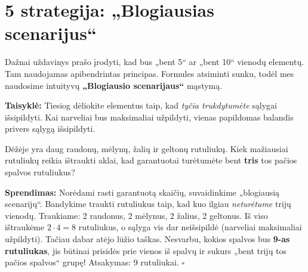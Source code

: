 \documentclass[11pt,a4paper]{scrartcl}
\newenvironment{solution}
    {\begin{list}{}{\setlength{\leftmargin}{10pt}\setlength{\rightmargin}{10pt}}\item[]}
    {\end{list}}
\begin{document}
\section{5 strategija: „Blogiausias scenarijus“}

Dažnai uždavinys prašo įrodyti, kad bus „bent 5“ ar „bent 10“ vienodų elementų. Tam naudojamas apibendrintas principas. Formules atsiminti sunku, todėl mes naudosime intuityvų \textbf{„Blogiausio scenarijaus“} mąstymą.

\textbf{Taisyklė:} Tiesiog dėliokite elementus taip, kad \textit{tyčia trukdytumėte} sąlygai išsipildyti. Kai narveliai bus maksimaliai užpildyti, vienas papildomas balandis privers sąlygą išsipildyti.

\begin{example}
Dėžėje yra daug raudonų, mėlynų, žalių ir geltonų rutuliukų. Kiek mažiausiai rutuliukų reikia ištraukti aklai, kad garantuotai turėtumėte bent \textbf{tris} tos pačios spalvos rutuliukus?
\end{example}

\begin{solution}
\textbf{Sprendimas:} Norėdami rasti garantuotą skaičių, suvaidinkime „blogiausią scenarijų“. Bandykime traukti rutuliukus taip, kad kuo ilgiau \textit{neturėtume} trijų vienodų.
Traukiame: 2 raudonus, 2 mėlynus, 2 žalius, 2 geltonus. 
Iš viso ištraukėme $2 \cdot 4 = 8$ rutuliukus, o sąlyga vis dar neišsipildė (narveliai maksimaliai užpildyti).
Tačiau dabar atėjo lūžio taškas. Nesvarbu, kokios spalvos bus \textbf{9-as rutuliukas}, jis būtinai prisidės prie vienos iš spalvų ir sukurs „bent trijų tos pačios spalvos“ grupę! Atsakymas: 9 rutuliukai. \hfill $\square$
\end{solution}
\end{document}
